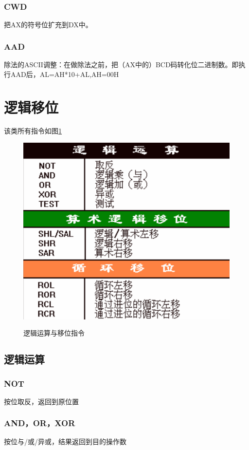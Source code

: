 \subsubsection{CWD}
把AX的符号位扩充到DX中。
\subsubsection{AAD}
除法的ASCII调整：在做除法之前，把（AX中的）BCD码转化位二进制数。即执行AAD后，AL=AH*10+AL,AH=00H
\section{逻辑移位}
该类所有指令如图\ref{逻辑运算与移位指令}
\begin{figure}[H]
    \centering 
    \includegraphics[scale=1]{part_指令系统/part_指令系统_pic/逻辑运算与移位指令.png}
    \label{逻辑运算与移位指令}
    \caption{逻辑运算与移位指令}
\end{figure}
\subsection{逻辑运算}
\subsubsection{NOT}
按位取反，返回到原位置
\subsubsection{AND，OR，XOR}
按位与/或/异或，结果返回到目的操作数
